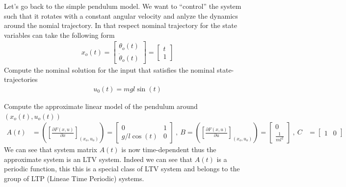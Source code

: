 \documentclass[twoside]{article}
\begin{document}
Let's go back to the simple pendulum model. We want to ``control'' the
system such that it rotates with a constant angular velocity and
anlyze the dynamics around the nomial trajectory. In that
respect nominal trajectory for the state variables can take the
following form
%
\begin{align*}
x_o(t) = \left[ \begin{array}{c} \theta_o(t) \\ \dot{\theta}_o(t) \end{array}
  \right] = \left[ \begin{array}{c} t \\ 1 \end{array}
  \right] 
\end{align*}
%
Compute the nominal solution for the input that satisfies the nominal
state-trajectories
%
%
\begin{align*}
u_0(t) = m g l \sin(t)
\end{align*}
%

Compute the approximate linear model of the pendulum around $(x_o(t),u_o(t)) $
%
\begin{align*}
A(t) &= \left( \left[ \frac{\partial F(x,u)}{\partial x}
                      \right]_{(x_o,u_o)} \right) =
                    \left[ \begin{array}{cc} 0 & 1 \\ g/l \cos(t) & 0 \end{array}  \right]
\ , \ B = \left( \left[ \frac{\partial F(x,u)}{\partial u}
                      \right]_{(x_o,u_o)} \right) =
                                                            \left[ \begin{array}{c}
                                                                     0
                                                                     \\
                                                                     \frac{1}{m
                                                                     l^2}  \end{array}  \right]
\ , \
C &= \left[ \begin{array}{cc} 1 & 0 \end{array}  \right]
\end{align*}
%
We can see that system matrix $A(t)$ is now time-dependent thus the
approximate system is an LTV system. Indeed we can see that $A(t)$ is
a periodic function, this this is a special class of LTV system and
belongs to the group of LTP (Lineae Time Periodic) systems. 

\end{document}
